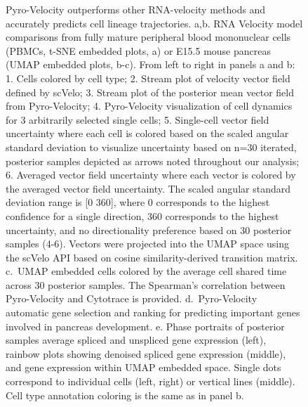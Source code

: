 \documentclass[
  sn-mathphys-num,
  lineno,
  twocolumn]{sn-jnl}
\begin{document}
\begin{figure}


\caption{\label{fig-model-results}Pyro-Velocity outperforms other
RNA-velocity methods and accurately predicts cell lineage trajectories.
a,b. RNA Velocity model comparisons from fully mature peripheral blood
mononuclear cells (PBMCs, t-SNE embedded plots, a) or E15.5 mouse
pancreas (UMAP embedded plots, b-c). From left to right in panels a and
b: 1. Cells colored by cell type; 2. Stream plot of velocity vector
field defined by scVelo; 3. Stream plot of the posterior mean vector
field from Pyro-Velocity; 4. Pyro-Velocity visualization of cell
dynamics for 3 arbitrarily selected single cells; 5. Single-cell vector
field uncertainty where each cell is colored based on the scaled angular
standard deviation to visualize uncertainty based on n=30 iterated,
posterior samples depicted as arrows noted throughout our analysis; 6.
Averaged vector field uncertainty where each vector is colored by the
averaged vector field uncertainty. The scaled angular standard deviation
range is {[}0 360{]}, where 0 corresponds to the highest confidence for
a single direction, 360 corresponds to the highest uncertainty, and no
directionality preference based on 30 posterior samples (4-6). Vectors
were projected into the UMAP space using the scVelo API based on cosine
similarity-derived transition matrix. c.~UMAP embedded cells colored by
the average cell shared time across 30 posterior samples. The Spearman's
correlation between Pyro-Velocity and Cytotrace is provided.
d.~Pyro-Velocity automatic gene selection and ranking for predicting
important genes involved in pancreas development. e. Phase portraits of
posterior samples average spliced and unspliced gene expression (left),
rainbow plots showing denoised spliced gene expression (middle), and
gene expression within UMAP embedded space. Single dots correspond to
individual cells (left, right) or vertical lines (middle). Cell type
annotation coloring is the same as in panel b.}

\end{figure}%
\end{document}

